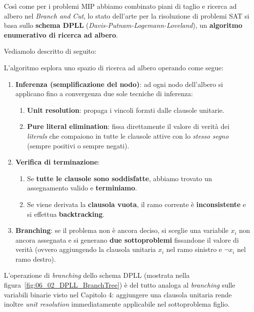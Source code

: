 Così come per i problemi MIP abbiamo combinato piani di taglio e ricerca ad albero nel 
\textit{Branch and Cut}, lo stato dell'arte per la risoluzione di problemi SAT si basa 
sullo \textbf{schema DPLL} (\textit{Davis-Putnam-Logemann-Loveland}), un 
\textbf{algoritmo enumerativo di ricerca ad albero}.

Vediamolo descritto di seguito:

\begin{definition}
    L'algoritmo esplora uno spazio di ricerca ad albero operando come segue:
    \begin{enumerate}
        \item \textbf{Inferenza (semplificazione del nodo)}: ad ogni nodo dell'albero si 
            applicano fino a convergenza due sole tecniche di inferenza:
            \begin{enumerate}
                \item \textbf{Unit resolution}: propaga i vincoli forzati dalle clausole unitarie.
                \item \textbf{Pure literal elimination}: fissa direttamente il valore di verità 
                    dei \textit{literals} che compaiono in tutte le clausole attive con lo 
                    \textit{stesso segno} (sempre positivi o sempre negati).
            \end{enumerate}
        \item \textbf{Verifica di terminazione}:
            \begin{enumerate}
                \item Se \textbf{tutte le clausole sono soddisfatte}, abbiamo trovato un 
                    assegnamento valido e \textbf{terminiamo}.
                \item Se viene derivata la \textbf{clausola vuota}, il ramo 
                    corrente è \textbf{inconsistente} e si effettua \textbf{backtracking}.
            \end{enumerate}
        \item \textbf{Branching}: se il problema non è ancora deciso, si sceglie una 
            variabile $x_i$ non ancora assegnata e si generano \textbf{due sottoproblemi} 
            fissandone il valore di verità (ovvero aggiungendo la clausola unitaria $x_i$ 
            nel ramo sinistro e $\neg x_i$ nel ramo destro).
    \end{enumerate}
\end{definition}

L'operazione di \textit{branching} dello schema DPLL (mostrata nella 
figura~\ref{fig:06_02_DPLL_BranchTree}) è del tutto analoga al \textit{branching} 
sulle variabili binarie visto nel Capitolo 4: aggiungere una clausola unitaria rende 
inoltre \textit{unit resolution} immediatamente applicabile nel sottoproblema figlio.

